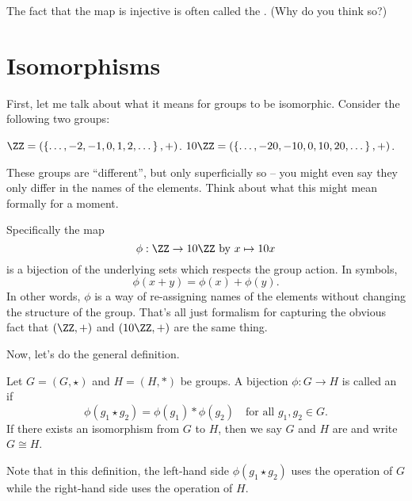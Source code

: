 The fact that the map is injective is often called the .
(Why do you think so?)

\section{Isomorphisms}
First, let me talk about what it means for groups to be isomorphic.
Consider the following two groups:
\begin{itemize}
	\ii $\ZZ = (\left\{ \dots,-2,-1,0,1,2,\dots \right\}, +)$.
	\ii $10\ZZ = (\left\{ \dots, -20, -10, 0, 10, 20, \dots \right\}, +)$.
\end{itemize}
These groups are ``different'', but only superficially so -- you might even say they only differ in the names of the elements.
Think about what this might mean formally for a moment.

Specifically the map
\[ \phi : \ZZ \to 10 \ZZ  \text{ by } x \mapsto 10 x \]
is a bijection of the underlying sets which respects the group action.
In symbols,
\[ \phi(x + y) = \phi(x) + \phi(y). \]
In other words, $\phi$ is a way of re-assigning names of the elements
without changing the structure of the group.
That's all just formalism for
capturing the obvious fact that $(\ZZ,+)$
and $(10 \ZZ, +)$ are the same thing.

Now, let's do the general definition.
\begin{definition}
	Let $G = (G, \star)$ and $H = (H, \ast)$ be groups.
	A bijection $\phi : G \to H$ is called an  if
	\[ \phi(g_1 \star g_2) = \phi(g_1) \ast \phi(g_2) \quad
		\text{for all $g_1, g_2 \in G$}. \]
	If there exists an isomorphism from $G$ to $H$,
	then we say $G$ and $H$ are  and write $G \cong H$.
\end{definition}
Note that in this definition, the left-hand side $\phi(g_1 \star g_2)$ uses the operation of $G$ while the right-hand side uses the operation of $H$.

